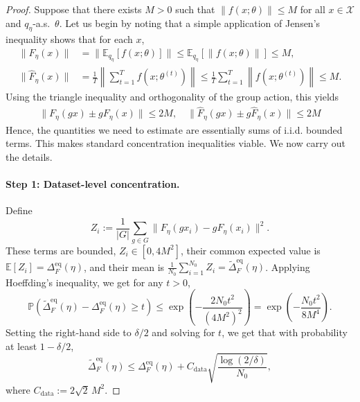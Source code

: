 \documentclass{article}
\begin{document}
\begin{proof}

Suppose that there exists $M > 0$ such that $\|f(x;\theta)\| \le M$ for all $x \in \mathcal{X}$ and $q_{\eta}$-a.s.\ $\theta$. Let us begin by noting that a simple application of Jensen's inequality shows that for each $x$,
\begin{align}
 \|F_{\eta}(x)\|& = \|\mathbb{E}_{q_{\eta}}[f(x;\theta)]\| \le \mathbb{E}_{q_{\eta}}[\|f(x;\theta)\|] \le M, \\
 \|\widehat{F}_{\eta}(x)\| &= \frac{1}{T}\left\|  \sum_{t=1}^T f(x;\theta^{(t)})\right\| \leq \frac{1}{T} \sum_{t=1}^T \left\|f(x; \theta^{(t)})\right\| \le M.
\end{align}
 Using the triangle inequality and orthogonality of the group action, this yields
 \begin{align}
     \|F_{\eta}(gx)\pm gF_\eta(x)\| \leq 2M, \quad \|\widehat{F}_\eta(gx)\pm g\widehat{F}_\eta(x)\| \leq 2M \label{eq:bounds}
 \end{align}
Hence, the quantities we need to estimate are essentially sums of i.i.d. bounded terms. This makes standard concentration inequalities viable. We now carry out the details.
    
    \paragraph{Step 1: Dataset-level concentration.} Define
    \begin{equation}
        Z_{i} := \frac{1}{|G|} \sum_{g \in G} \|F_{\eta}(gx_{i}) - g F_{\eta}(x_{i})\|^{2}.
    \end{equation}
    These terms are bounded, $Z_{i} \in [0,4M^{2}]$, their common expected value is $\mathbb{E}[Z_{i}] = \Delta^{\mathrm{eq}}_{F}(\eta)$, and their mean is $\frac{1}{N_{0}}\sum_{i=1}^{N_{0}} Z_{i} = \widetilde{\Delta}^{\mathrm{eq}}_{F}(\eta)$. Applying Hoeffding's inequality, we get for any $ t > 0$,
    \begin{equation}
        \mathbb{P}\!\left(\widetilde{\Delta}^{\mathrm{eq}}_{F}(\eta) -\Delta^{\mathrm{eq}}_{F}(\eta) \ge  t\right) \le \exp\!\left(-\frac{2 N_{0} t^{2}}{(4M^{2})^{2}}\right) = \exp\!\left(-\frac{N_{0}  t^{2}}{8 M^{4}}\right).
    \end{equation}
    Setting the right-hand side to $\delta/2$ and solving for $ t$, we get that with probability at least $1-\delta/2$,
    \begin{equation} \label{eq:hoeffding}
        \widetilde{\Delta}^{\mathrm{eq}}_{F}(\eta)  \leq \Delta^{\mathrm{eq}}_{F}(\eta)+ C_{\mathrm{data}}\sqrt{\frac{\log(2/\delta)}{N_{0}}},
    \end{equation}
    where $C_{\mathrm{data}} := 2\sqrt{2}\,M^{2}$.
    

\end{proof}
\end{document}
